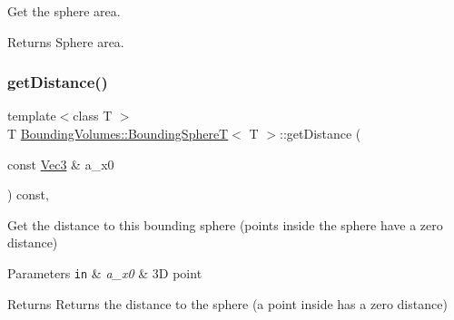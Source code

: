 Get the sphere area. 

\begin{DoxyReturn}{Returns}
Sphere area. 
\end{DoxyReturn}
\mbox{\label{classBoundingVolumes_1_1BoundingSphereT_a06ec858b7349e6a926ad476990c774cb}} 
\subsubsection{\texorpdfstring{get\+Distance()}{getDistance()}}
{\footnotesize\ttfamily template$<$class T $>$ \\
T \hyperlink{classBoundingVolumes_1_1BoundingSphereT}{Bounding\+Volumes\+::\+Bounding\+SphereT}$<$ T $>$\+::get\+Distance (\begin{DoxyParamCaption}\item[{const \hyperlink{classBoundingVolumes_1_1BoundingSphereT_ad89ed315255abcde216e9ca1de3068ab}{Vec3} \&}]{a\+\_\+x0 }\end{DoxyParamCaption}) const\hspace{0.3cm}{\ttfamily [inline]}, {\ttfamily [noexcept]}}



Get the distance to this bounding sphere (points inside the sphere have a zero distance) 


\begin{DoxyParams}[1]{Parameters}
\mbox{\tt in}  & {\em a\+\_\+x0} & 3D point \\
\hline
\end{DoxyParams}
\begin{DoxyReturn}{Returns}
Returns the distance to the sphere (a point inside has a zero distance) 
\end{DoxyReturn}
\mbox{\label{classBoundingVolumes_1_1BoundingSphereT_aee81818917225b65b6c3b661e268e66f}} 
